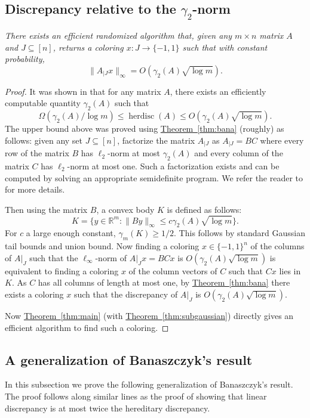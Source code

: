 \documentclass[11pt]{article}
\numberwithin{equation}{section}
\theoremstyle{definition}
\theoremstyle{plain}
\newcommand{\expref}[2]{\hyperref[#2]{#1~\ref{#2}}}
\DeclareMathOperator{\herdisc}{herdisc}   %
\begin{document}
\subsection{Discrepancy relative to the \texorpdfstring{$\gamma_2$}{gamma2}-norm}
\noindent{\bf \expref{Corollary}{thm:herdisc} (restated).} \emph{There exists an efficient randomized algorithm that, given any $m\times n$ matrix $A$ and $J\subseteq[n]$, returns a coloring $x:J\rightarrow\{-1,1\}$ such that with constant probability,
\[ \| A_{|J} x\|_{\infty} = O(\gamma_2(A)\sqrt{\log m}).\] }
\begin{proof}
It was shown in \cite{MNT14} that for any matrix $A$, there exists an efficiently computable quantity $\gamma_2(A)$ such that
\[ \Omega(\gamma_2(A)/\log m)\le \herdisc(A) \le O(\gamma_2(A)\sqrt{\log m}).\]
The upper bound above was proved using \expref{Theorem}{thm:bana} (roughly) as follows: given any set $J\subseteq [n]$, factorize the matrix $A_{|J}$ as $A_{|J}=BC$
where every row of the matrix
%
$B$ has $\ell_2$-norm at most $\gamma_2(A)$ and every column of 
the matrix 
%
$C$ has $\ell_2$-norm at most one. Such a factorization exists and can be computed by solving an appropriate semidefinite program. We refer the reader to \cite{MNT14} for more details.

Then using the matrix $B$, a convex body $K$ is defined as follows:
\[ K=\{ y\in\mathbb{R}^m: \| By\|_{\infty} \le c\gamma_2(A)\sqrt{\log m} \}. \]
For $c$ a large enough constant, $\gamma_m(K)\ge 1/2$. This follows by standard Gaussian tail bounds and union bound. Now finding a coloring $x\in\{-1,1\}^n$ of the columns of $A|_J$ such that the $\ell_\infty$-norm of $A|_J x=BCx$ is $O(\gamma_2(A)\sqrt{\log m})$ is equivalent to finding a coloring $x$ of the column vectors of $C$ such that $Cx$ lies in $K$. As $C$ has all columns of length at most one, by \expref{Theorem}{thm:bana} there exists a coloring $x$ such that the  discrepancy of $A|_J$ is $O(\gamma_2(A)\sqrt{\log m})$.

Now \expref{Theorem}{thm:main} (with \expref{Theorem}{thm:subgaussian}) directly gives an efficient algorithm to find such a coloring.
\end{proof}


\subsection{A generalization of Banaszczyk's result}


In this subsection we prove the following generalization of Banaszczyk's result. The proof follows along similar lines as the proof of \cite{LSV} showing that linear discrepancy is at most twice the hereditary discrepancy.\\
\end{document}
